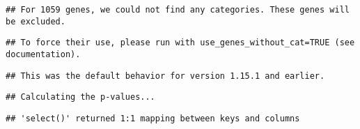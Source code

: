 \documentclass[]{article}
\newenvironment{Shaded}{\begin{snugshade}}{\end{snugshade}}
\newcommand{\DataTypeTok}[1]{\textcolor[rgb]{0.13,0.29,0.53}{#1}}
\newcommand{\DecValTok}[1]{\textcolor[rgb]{0.00,0.00,0.81}{#1}}
\newcommand{\KeywordTok}[1]{\textcolor[rgb]{0.13,0.29,0.53}{\textbf{#1}}}
\newcommand{\NormalTok}[1]{#1}
\newcommand{\OperatorTok}[1]{\textcolor[rgb]{0.81,0.36,0.00}{\textbf{#1}}}
\newcommand{\StringTok}[1]{\textcolor[rgb]{0.31,0.60,0.02}{#1}}
\begin{document}
\begin{verbatim}
## For 1059 genes, we could not find any categories. These genes will be excluded.
\end{verbatim}

\begin{verbatim}
## To force their use, please run with use_genes_without_cat=TRUE (see documentation).
\end{verbatim}

\begin{verbatim}
## This was the default behavior for version 1.15.1 and earlier.
\end{verbatim}

\begin{verbatim}
## Calculating the p-values...
\end{verbatim}

\begin{verbatim}
## 'select()' returned 1:1 mapping between keys and columns
\end{verbatim}

\begin{Shaded}
\end{Shaded}
\end{document}
